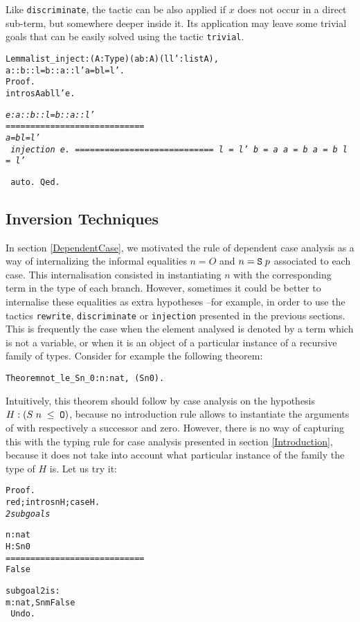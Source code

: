 \documentclass[11pt]{article}
\begin{document}
Like \texttt{discriminate}, the tactic 
can be also applied if $x$ does not
occur in a direct sub-term, but somewhere deeper inside it. Its
application may leave some trivial goals that can be easily solved
using the tactic \texttt{trivial}.

\begin{alltt}

 Lemma list_inject : {\prodsym} (A:Type)(a b :A)(l l':list A),
             a :: b :: l = b :: a :: l' {\arrow} a = b {\coqand} l = l'.
Proof.
 intros A a b l l' e.


\it
  e : a :: b :: l = b :: a :: l'
  ============================
   a = b {\coqand} l = l'
\tt
 injection e.
\it
  ============================
   l = l' {\arrow} b = a {\arrow} a = b {\arrow} a = b {\coqand} l = l'

\tt{} auto.
Qed.
\end{alltt}

\subsection{Inversion Techniques}\label{inversion}

In section \ref{DependentCase}, we motivated the rule of dependent case
analysis as a way of internalizing the informal equalities $n=O$ and
$n=\texttt{S}\;p$ associated to each case. This internalisation
consisted in instantiating $n$ with the corresponding term in the type
of each branch. However, sometimes it could be better to internalise
these equalities as extra hypotheses --for example, in order to use
the tactics \texttt{rewrite}, \texttt{discriminate} or
\texttt{injection} presented in the previous sections. This is
frequently the case when the element analysed is denoted by a term
which is not a variable, or when it is an object of a particular
instance of a recursive family of types. Consider for example the
following theorem:

\begin{alltt}
Theorem not_le_Sn_0 : {\prodsym} n:nat, ~ (S n {\coqle} 0).
\end{alltt}

\noindent Intuitively, this theorem should follow by case analysis on
the hypothesis $H:(S\;n\;\leq\;\texttt{O})$, because no introduction rule allows
to instantiate the arguments of  with respectively a successor
and zero. However, there
is no way of capturing this with the typing rule for case analysis
presented in section \ref{Introduction}, because it does not take into
account what particular instance of the family the type of $H$ is.
Let us try it:
\begin{alltt}
Proof.
 red; intros n H; case H.
\it 2 subgoals

  n : nat
  H : S n {\coqle} 0
  ============================
   False

subgoal 2 is:
 {\prodsym} m : nat, S n {\coqle} m {\arrow} False
\tt
Undo.
\end{alltt}
\end{document}
